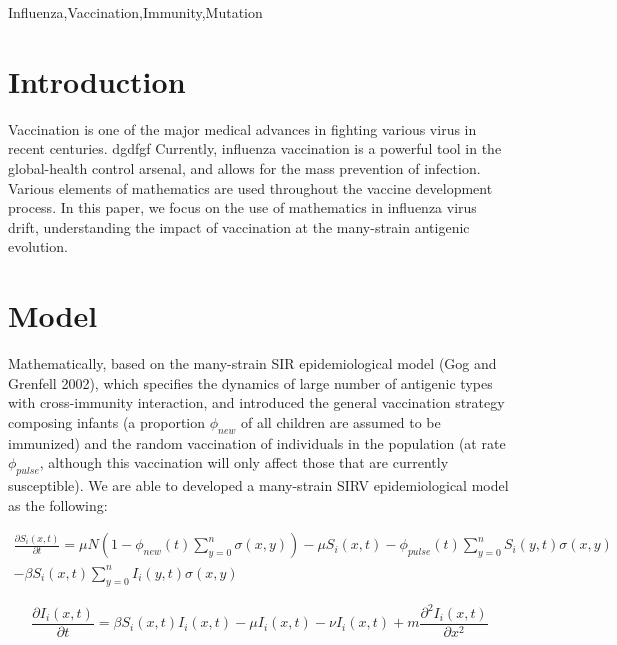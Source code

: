 \documentclass[preprint,12pt]{elsarticle}
\begin{document}
\begin{frontmatter}
\begin{keyword}
Influenza\sep Vaccination\sep Immunity\sep Mutation
\end{keyword}

\end{frontmatter}

\section{Introduction}
Vaccination is one of the major medical advances in fighting various virus in recent centuries. dgdfgf
Currently, influenza vaccination is a powerful tool in the global-health control arsenal, and allows for the mass prevention of infection.
Various elements of mathematics are used throughout the vaccine development process.
In this paper, we focus on the use of mathematics in influenza virus drift, understanding the impact of vaccination at the many-strain antigenic evolution. 

\section{Model}
Mathematically, based on the many-strain SIR epidemiological model (Gog and Grenfell 2002), which specifies the dynamics of large number of antigenic types with cross-immunity interaction, and introduced the general vaccination strategy composing infants (a proportion \(\phi_{new}\) of all children are assumed to be immunized) and the random vaccination of individuals in the population (at rate \(\phi_{pulse}\), although this vaccination will only affect those that are currently susceptible).
We are able to developed a many-strain SIRV epidemiological model as the following:

\begin{align}
  \label{eq:S}
  \frac{\partial S_i(x,t)}{\partial t} = \mu N(1-\phi_{new}(t)\sum_{y=0}^{n} \sigma(x,y)) - \mu S_i(x,t) - \phi_{pulse}(t)\sum_{y=0}^{n} S_i(y,t)\sigma(x,y) 
  \nonumber\\
  - \beta S_i(x,t)\sum_{y=0}^{n} I_i(y,t)\sigma(x,y)
\end{align}

\begin{equation}
  \label{eq:I}
  \frac{\partial I_i(x,t)}{\partial t} = \beta S_i(x,t) I_i(x,t) - \mu I_i(x,t) - \nu I_i(x,t) + m \frac{\partial^2I_i(x,t)}{\partial x^2}
\end{equation}
\end{document}
